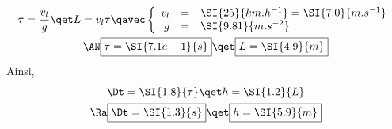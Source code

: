 \documentclass[a4paper, 12pt, final, garamond]{book}
\begin{document}
\begin{enumerate}
        \begin{gather*}
            \tau = \frac{v_l}{g}
            \qet
            L = v_l\tau
            \qavec
            \left\{
                \begin{array}{rcl}
                    v_l & = & \SI{25}{km.h^{-1}} = \SI{7.0}{m.s^{-1}}\\
                    g & = & \SI{9.81}{m.s^{-2}}
                \end{array}
            \right.\\
            \AN
            \boxed{\tau = \SI{7.1e-1}{s}}
            \qet
            \boxed{L = \SI{4.9}{m}}
        \end{gather*}
        Ainsi, \vspace*{-24pt}
        \begin{gather*}
            \Dt = \SI{1.8}{\tau}
            \qet
            h = \SI{1.2}{L}
            \\\Ra
            \boxed{\Dt = \SI{1.3}{s}}
            \qet
            \boxed{h = \SI{5.9}{m}}
        \end{gather*}
\end{enumerate}
\end{document}
